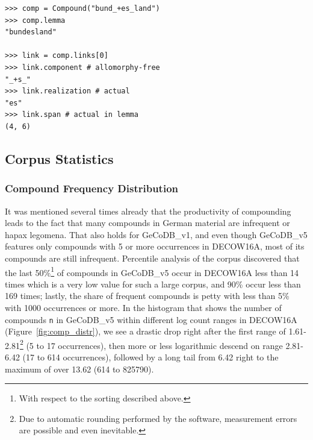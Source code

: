 \documentclass[11pt]{article}
\begin{document}
\begin{minipage}{\linewidth}
\begin{lstlisting}[caption={Example of eliminative parsing of GeCoDB\_v5 entry \texttt{"bund\_+es\_land"}}, label={code:parsing2}, captionpos=b]
>>> comp = Compound("bund_+es_land")
>>> comp.lemma
"bundesland"

>>> link = comp.links[0]
>>> link.component # allomorphy-free
"_+s_"
>>> link.realization # actual
"es"
>>> link.span # actual in lemma
(4, 6)
\end{lstlisting}
\end{minipage}


\subsection{Corpus Statistics}

\subsubsection{Compound Frequency Distribution}

It was mentioned several times already that the productivity of compounding leads to the fact that many compounds in German material are infrequent or hapax legomena. That also holds for GeCoDB\_v1, and even though GeCoDB\_v5 features only compounds with 5 or more occurrences in DECOW16A, most of its compounds are still infrequent. Percentile analysis of the corpus discovered that the last 50\%\footnote{With respect to the sorting described above.} of compounds in GeCoDB\_v5 occur in DECOW16A less than 14 times which is a very low value for such a large corpus, and 90\% occur less than 169 times; lastly, the share of frequent compounds is petty with less than 5\% with 1000 occurrences or more. In the histogram that shows the number of compounds \texttt{n} in GeCoDB\_v5  within different log count ranges in DECOW16A (Figure~\ref{fig:comp_distr}), we see a drastic drop right after the first range of 1.61-2.81\footnote{Due to automatic rounding performed by the software, measurement errors are possible and even inevitable.} (5 to 17 occurrences), then more or less logarithmic descend on range 2.81-6.42 (17 to 614 occurrences), followed by a long tail from 6.42 right to the maximum of over 13.62 (614 to 825790).
\end{document}
